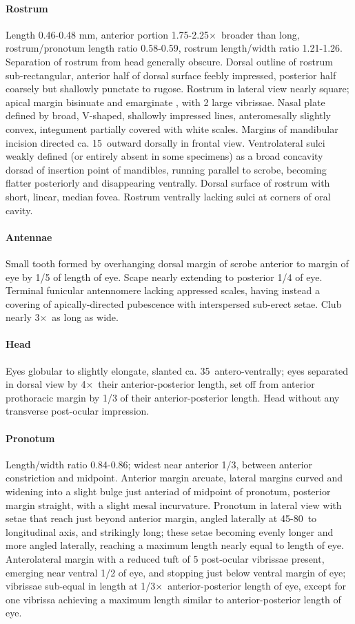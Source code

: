 \documentclass[fleqn,10pt,lineno]{wlpeerj} %
\newcommand{\td}{\textdegree~}
\newcommand{\x}{$\times$~}
\begin{document}
			\paragraph{Rostrum}
				Length 0.46-0.48 mm, anterior portion 1.75-2.25\x broader than long, rostrum/pronotum length ratio 0.58-0.59, rostrum length/width ratio 1.21-1.26.
				Separation of rostrum from head generally obscure. 
				Dorsal outline of rostrum sub-rectangular, anterior half of dorsal surface feebly impressed, posterior half coarsely but shallowly punctate to rugose. 
				Rostrum in lateral view nearly square; apical margin bisinuate and emarginate , with 2 large vibrissae. 
				Nasal plate defined by broad, V-shaped, shallowly impressed lines, anteromesally slightly convex, integument partially covered with white scales. 
				Margins of mandibular incision directed ca. 15\td outward dorsally in frontal view. 
				Ventrolateral sulci weakly defined (or entirely absent in some specimens) as a broad concavity dorsad of insertion point of mandibles, running parallel to scrobe, becoming flatter posteriorly and disappearing ventrally.
				Dorsal surface of rostrum with  short, linear, median fovea.
				Rostrum ventrally lacking sulci at corners of oral cavity.
			\paragraph{Antennae}
				Small tooth formed by overhanging dorsal margin of scrobe anterior to margin of eye by 1/5 of length of eye.
				Scape nearly extending to posterior 1/4 of eye.
				Terminal funicular antennomere lacking appressed scales, having instead a covering of apically-directed pubescence with interspersed sub-erect setae.
				Club nearly 3\x as long as wide.
			\paragraph{Head}
				Eyes globular to slightly elongate, slanted ca. 35\td antero-ventrally; eyes separated in dorsal view by 4\x their anterior-posterior length, set off from anterior prothoracic margin by 1/3 of their anterior-posterior length. 
				Head without any transverse post-ocular impression.
			\paragraph{Pronotum}
				Length/width ratio 0.84-0.86; widest near anterior 1/3, between anterior constriction and midpoint. 
				Anterior margin arcuate, lateral margins curved and widening into a slight bulge just anteriad of midpoint of pronotum, posterior margin straight, with a slight mesal incurvature. 
				Pronotum in lateral view with setae that reach just beyond anterior margin, angled laterally at 45-80\td to longitudinal axis, and strikingly long; these setae becoming evenly longer and more angled laterally, reaching a maximum length nearly equal to length of eye. 
				Anterolateral margin with a reduced tuft of 5 post-ocular vibrissae present, emerging near ventral 1/2 of eye, and stopping just below ventral margin of eye; vibrissae sub-equal in length at 1/3\x anterior-posterior length of eye, except for one vibrissa achieving a maximum length similar to anterior-posterior length of eye.
\end{document}
